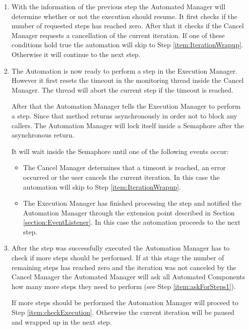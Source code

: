 \begin{enumerate}
 \item \label{item:checkExecution} With the information of the previous step the Automated Manager
will determine whether or not the execution should resume. It first checks if the number of requested
steps has reached zero. After that it checks if the Cancel Manager requests a cancellation
of the current iteration. If one of these conditions hold true the automation will skip to
Step \ref{item:IterationWrapup}. Otherwise it will continue to the next step.

 \item \label{item:performStep} The Automation is now ready to perform a step in the Execution Manager.
However it first resets the timeout in the monitoring thread inside the Cancel Manager. The thread will
abort the current step if the timeout is reached.

After that the Automation Manager tells the Execution Manager to perform a step. Since that method
returns asynchronously in order not to block any callers. The Automation Manager will lock itself
inside a Semaphore after the asynchronous return.

It will wait inside the Semaphore until one of the following events occur:
  \begin{itemize}
   \item The Cancel Manager determines that a timeout is reached, an error occurred or the user cancels
the current iteration. In this case the automation will skip to Step \ref{item:IterationWrapup}.
   \item The Execution Manager has finished processing the step and notified the Automation Manager
through the extension point described in Section \ref{section:EventListener}. In this case
the automation proceeds to the next step.
  \end{itemize}

 \item \label{item:askForSteps2} After the step was successfully executed the Automation Manager has
to check if more steps should be performed. If at this stage the number of remaining steps has
reached zero and the iteration was not canceled by the Cancel Manager the Automated Manager will
ask all Automated Components how many more steps they need to perform (see Step \ref{item:askForSteps1}).

If more steps should be performed the Automation Manager will proceed to Step \ref{item:checkExecution}. Otherwise
the current iteration will be paused and wrapped up in the next step.


\end{enumerate}

